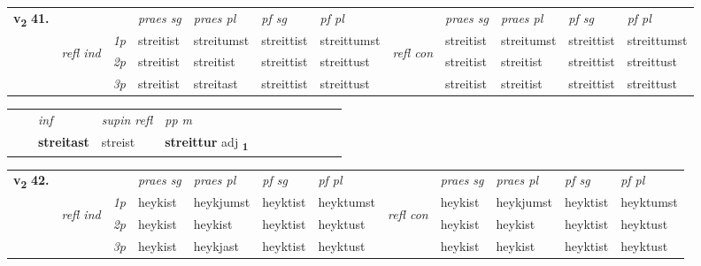\begin{tabular}{llllllllllll} \toprule
\multirow{4}{*}{{{\textbf{v{\textsubscript{2}}} \Large{\textbf{41.}}}}}  & &   &  \textit{praes sg}  & \textit{praes pl}  &\textit{pf sg} & \textit{pf pl} &  &  \textit{praes sg}  & \textit{praes pl}  & \textit{pf sg} & \textit{pf pl } \\*
	\cmidrule{4-7} \cmidrule{9-12}
 &\multirow{3}{*}{\begin{turn}{90}\textit{refl ind}\end{turn}} & {\textit{1p}} & streitist & streitumst    & streittist & streittumst & \multirow{3}{*}{\begin{turn}{90}\textit{refl con}\end{turn}}  &streitist & streitumst & streittist & streittumst\\*
 &&  {\textit{2p}} &  streitist  & streitist   & streittist & streittust & &streitist & streitist & streittist & streittust \\*
& &  {\textit{3p}} & streitist & streitast   & streittist & streittust & & streitist & streitist& streittist & streittust  \\*
\cmidrule{4-7} \cmidrule{9-12}
\end{tabular}


\begin{tabular}{llllllllllll}
 & & \textit{inf}       & \textit{supin refl} & \textit{pp m}     \\*
  & & \textbf{streitast}        & streist & \textbf{streittur} adj \textbf{\textsubscript{1}} \\*
\cmidrule{1-12}
\end{tabular}



\begin{tabular}{llllllllllll} \toprule
\multirow{4}{*}{{{\textbf{v{\textsubscript{2}}} \Large{\textbf{42.}}}}}  & &   &  \textit{praes sg}  & \textit{praes pl}  &\textit{pf sg} & \textit{pf pl} &  &  \textit{praes sg}  & \textit{praes pl}  & \textit{pf sg} & \textit{pf pl } \\*
	\cmidrule{4-7} \cmidrule{9-12}
 &\multirow{3}{*}{\begin{turn}{90}\textit{refl ind}\end{turn}} & {\textit{1p}} & heykist & heykjumst    & heyktist & heyktumst & \multirow{3}{*}{\begin{turn}{90}\textit{refl con}\end{turn}}  &heykist & heykjumst & heyktist & heyktumst\\*
 &&  {\textit{2p}} &  heykist  & heykist   & heyktist & heyktust & &heykist & heykist & heyktist & heyktust \\*
& &  {\textit{3p}} & heykist & heykjast   & heyktist & heyktust & & heykist & heykist& heyktist & heyktust  \\*
\cmidrule{4-7} \cmidrule{9-12}
\end{tabular}


